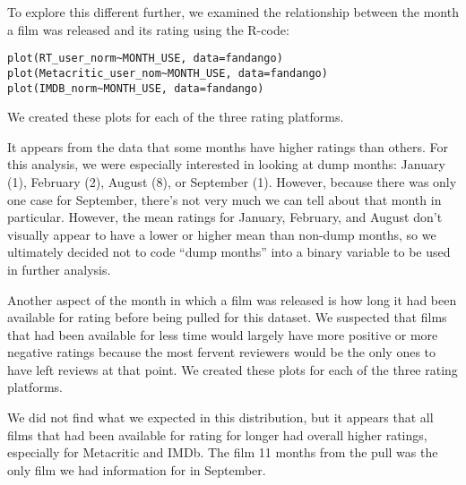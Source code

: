 \documentclass[a4paper,12pt]{report}
\begin{document}
	To explore this different further, we examined the relationship between the month a film was released and its rating using the R-code:
	\begin{verbatim}
plot(RT_user_norm~MONTH_USE, data=fandango)
plot(Metacritic_user_nom~MONTH_USE, data=fandango)
plot(IMDB_norm~MONTH_USE, data=fandango)
	\end{verbatim}
	We created these plots for each of the three rating platforms.
	\begin{center}
	\end{center}
	It appears from the data that some months have higher ratings than others. For this analysis, we were especially interested in looking at dump months: January (1), February (2), August (8), or September (1). However, because there was only one case for September, there’s not very much we can tell about that month in particular. However, the mean ratings for January, February, and August don’t visually appear to have a lower or higher mean than non-dump months, so we ultimately decided not to code “dump months” into a binary variable to be used in further analysis. 

	Another aspect of the month in which a film was released is how long it had been available for rating before being pulled for this dataset. We suspected that films that had been available for less time would largely have more positive or more negative ratings because the most fervent reviewers would be the only ones to have left reviews at that point. 
	We created these plots for each of the three rating platforms.
	\begin{center}
	\end{center}
	We did not find what we expected in this distribution, but it appears that all films that had been available for rating for longer had overall higher ratings, especially for Metacritic and IMDb. The film 11 months from the pull was the only film we had information for in September. 
\end{document}
